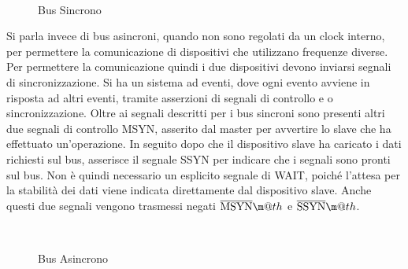 \documentclass{article}
\makeatletter
\newcommand*{\textoverline}[1]{$\overline{\hbox{#1}}\m@th$}
\numberwithin{equation}{subsection}
\makeatother
\begin{document}
\begin{figure}[H]%
    \centering
    \\
    \caption{Bus Sincrono}%
\end{figure}

Si parla invece di bus asincroni, quando non sono regolati da un clock interno, per permettere la comunicazione di dispositivi che utilizzano frequenze diverse. Per permettere 
la comunicazione quindi i due dispositivi devono inviarsi segnali di sincronizzazione. Si ha un sistema ad eventi, dove ogni evento avviene in risposta ad altri eventi, 
tramite asserzioni di segnali di controllo e o sincronizzazione. Oltre ai segnali descritti per i bus sincroni sono presenti altri due segnali di controllo MSYN, asserito 
dal master per avvertire lo slave che ha effettuato un'operazione. In seguito dopo che il dispositivo slave ha caricato i dati richiesti sul bus, asserisce il segnale 
SSYN per indicare che i segnali sono pronti sul bus. Non è quindi necessario un esplicito segnale di WAIT, poiché l'attesa per la stabilità dei dati viene indicata 
direttamente dal dispositivo slave. Anche questi due segnali vengono trasmessi negati \textoverline{MSYN} e \textoverline{SSYN}. 

\begin{figure}[H]%
    \centering
    \\
    \caption{Bus Asincrono}%
\end{figure}
\end{document}
